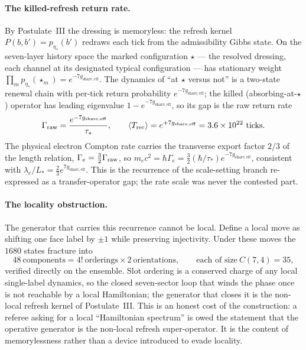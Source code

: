 \documentclass[11pt]{article}
\begin{document}
\paragraph{The killed-refresh return rate.}
By Postulate~III the dressing is memoryless: the refresh kernel $P(b,b')=p_{\eta_*}(b')$ redraws each tick from the admissibility Gibbs state. On the seven-layer history space the marked configuration $\star$ --- the resolved dressing, each channel at its designated typical configuration --- has stationary weight $\prod_m p_{\eta_*}(\star_m)=e^{-7g_{\mathrm{share,eff}}}$. The dynamics of ``at $\star$ versus not'' is a two-state renewal chain with per-tick return probability $e^{-7g_{\mathrm{share,eff}}}$; the killed (absorbing-at-$\star$) operator has leading eigenvalue $1-e^{-7g_{\mathrm{share,eff}}}$, so its gap is the raw return rate
\[
\Gamma_{\rm raw}=\frac{e^{-7g_{\mathrm{share,eff}}}}{\tau_*},\qquad \langle T_{\rm rec}\rangle=e^{+7g_{\mathrm{share,eff}}}=3.6\times10^{22}\ \text{ticks}.
\]
The physical electron Compton rate carries the transverse export factor $2/3$ of the length relation, $\Gamma_e=\tfrac32\Gamma_{\rm raw}$, so $m_ec^2=\hbar\Gamma_e=\tfrac32(\hbar/\tau_*)e^{-7g_{\mathrm{share,eff}}}$, consistent with $\lambda_e/L_*=\tfrac23 e^{7g_{\mathrm{share,eff}}}$. This is the recurrence of the scale-setting branch re-expressed as a transfer-operator gap; the rate scale was never the contested part.

\paragraph{The locality obstruction.}
The generator that carries this recurrence cannot be local. Define a local move as shifting one face label by $\pm1$ while preserving injectivity. Under these moves the $1680$ states fracture into
\[
48\ \text{components}=4!\ \text{orderings}\times2\ \text{orientations},\qquad \text{each of size}\ C(7,4)=35,
\]
verified directly on the ensemble. Slot ordering is a conserved charge of any local single-label dynamics, so the closed seven-sector loop that winds the phase once is not reachable by a local Hamiltonian; the generator that closes it is the non-local refresh kernel of Postulate~III. This is an honest cost of the construction: a referee asking for a local ``Hamiltonian spectrum'' is owed the statement that the operative generator is the non-local refresh super-operator. It is the content of memorylessness rather than a device introduced to evade locality.
\end{document}

